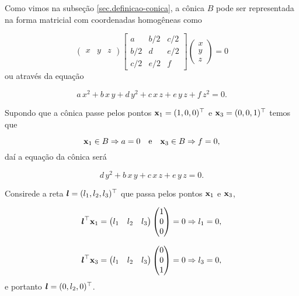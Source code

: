 Como vimos na subseção \ref{sec.definicao-conica}, a cônica $B$ pode ser representada na forma matricial com coordenadas homogêneas como

\begin{equation*}
\begin{pmatrix}
x&y&z
\end{pmatrix}
\begin{bmatrix}
a&b/2&c/2\\
b/2&d&e/2\\
c/2&e/2&f
\end{bmatrix}
\begin{pmatrix}
x\\
y\\
z
\end{pmatrix}
=0
\end{equation*}
ou através da equação

\begin{equation*}
a\,x^2+b\,x\,y+d\,y^2+c\,x\,z+e\,y\,z+f\,z^2=0.
\end{equation*}

Supondo que a cônica passe pelos pontos $\mathbf{x}_1=(1,0,0)^\top$ e $\mathbf{x}_3=(0,0,1)^\top$ temos que

\begin{equation*}
\mathbf{x}_1\in B\Rightarrow a=0\quad\text{e}\quad\mathbf{x}_3\in B\Rightarrow f=0,
\end{equation*}
daí a equação da cônica será 

\begin{equation}\label{eq.reducao-parcial-conica}
d\,y^2+b\,x\,y+c\,x\,z+e\,y\,z=0.
\end{equation}

Consirede a reta $\boldsymbol{l}=(l_1,l_2,l_3)^\top$ que passa pelos pontos $\mathbf{x}_1$ e $\mathbf{x}_3$,

\begin{equation*}
\boldsymbol{l}^\top\mathbf{x}_1=
\begin{pmatrix}
l_1&l_2&l_3
\end{pmatrix}
\begin{pmatrix}
1\\
0\\
0
\end{pmatrix}
=0
\Rightarrow l_1=0,
\end{equation*} 

\begin{equation*}
\boldsymbol{l}^\top\mathbf{x}_3=
\begin{pmatrix}
l_1&l_2&l_3
\end{pmatrix}
\begin{pmatrix}
0\\
0\\
1
\end{pmatrix}
=0
\Rightarrow l_3=0,
\end{equation*} 
e portanto $\boldsymbol{l}=(0,l_2,0)^\top$.

